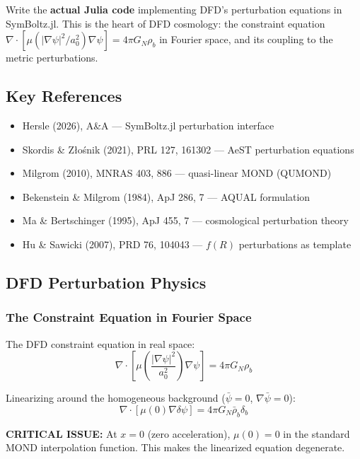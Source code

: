 \documentclass[11pt,a4paper]{article}
\begin{document}
Write the \textbf{actual Julia code} implementing DFD's perturbation equations in SymBoltz.jl. This is the heart of DFD cosmology: the constraint equation $\nabla\cdot[\mu(|\nabla\psi|^2/a_0^2)\nabla\psi] = 4\pi G_N\rho_b$ in Fourier space, and its coupling to the metric perturbations.

\subsection{Key References}

\begin{itemize}
\item Hersle (2026), A\&A --- SymBoltz.jl perturbation interface
\item Skordis \& Z{\l}o\'{s}nik (2021), PRL 127, 161302 --- AeST perturbation equations
\item Milgrom (2010), MNRAS 403, 886 --- quasi-linear MOND (QUMOND)
\item Bekenstein \& Milgrom (1984), ApJ 286, 7 --- AQUAL formulation
\item Ma \& Bertschinger (1995), ApJ 455, 7 --- cosmological perturbation theory
\item Hu \& Sawicki (2007), PRD 76, 104043 --- $f(R)$ perturbations as template
\end{itemize}

\subsection{DFD Perturbation Physics}

\subsubsection{The Constraint Equation in Fourier Space}

The DFD constraint equation in real space:
\begin{equation}
\nabla\cdot\left[\mu\!\left(\frac{|\nabla\psi|^2}{a_0^2}\right)\nabla\psi\right] = 4\pi G_N\rho_b
\end{equation}

Linearizing around the homogeneous background ($\bar{\psi} = 0$, $\nabla\bar{\psi} = 0$):
\begin{equation}
\nabla\cdot\left[\mu(0)\nabla\delta\psi\right] = 4\pi G_N\bar{\rho}_b\delta_b
\end{equation}

\textbf{CRITICAL ISSUE:} At $x = 0$ (zero acceleration), $\mu(0) = 0$ in the standard MOND interpolation function. This makes the linearized equation degenerate.
\end{document}
